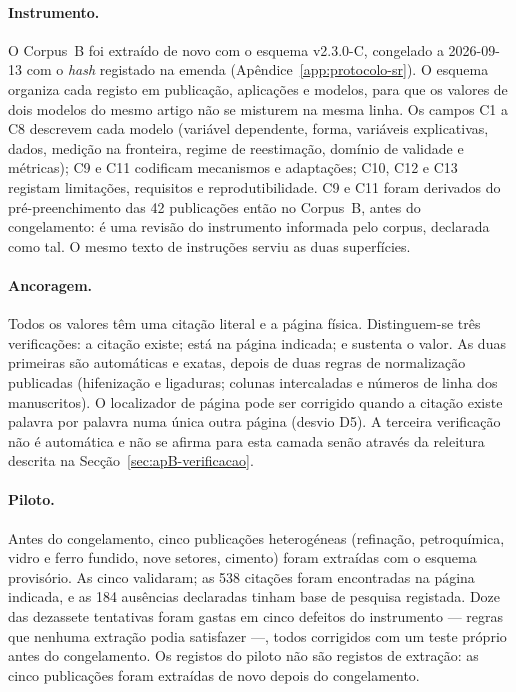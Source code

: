 \paragraph{Instrumento.} O Corpus~B foi extraído de novo com o esquema
v2.3.0-C, congelado a 2026-09-13 com o \emph{hash} registado na emenda
(Apêndice~\ref{app:protocolo-sr}). O esquema organiza cada registo em
publicação, aplicações e modelos, para que os valores de dois modelos do
mesmo artigo não se misturem na mesma linha. Os campos C1 a C8 descrevem cada
modelo (variável dependente, forma, variáveis explicativas, dados, medição na
fronteira, regime de reestimação, domínio de validade e métricas); C9 e C11
codificam mecanismos e adaptações; C10, C12 e C13 registam limitações,
requisitos e reprodutibilidade. C9 e C11 foram derivados do pré-preenchimento
das 42 publicações então no Corpus~B, antes do congelamento: é uma revisão do
instrumento informada pelo corpus, declarada como tal. O mesmo texto de
instruções serviu as duas superfícies.

\paragraph{Ancoragem.} Todos os valores têm uma citação literal e a página
física. Distinguem-se três verificações: a citação existe; está na página
indicada; e sustenta o valor. As duas primeiras são automáticas e exatas,
depois de duas regras de normalização publicadas (hifenização e ligaduras;
colunas intercaladas e números de linha dos manuscritos). O localizador de
página pode ser corrigido quando a citação existe palavra por palavra numa
única outra página (desvio D5). A terceira verificação não é automática e não
se afirma para esta camada senão através da releitura descrita na
Secção~\ref{sec:apB-verificacao}.

\paragraph{Piloto.} Antes do congelamento, cinco publicações heterogéneas
(refinação, petroquímica, vidro e ferro fundido, nove setores, cimento)
foram extraídas com o esquema provisório. As cinco validaram; as 538
citações foram encontradas na página indicada, e as 184 ausências declaradas
tinham base de pesquisa registada. Doze das dezassete tentativas foram gastas
em cinco defeitos do instrumento --- regras que nenhuma extração podia
satisfazer ---, todos corrigidos com um teste próprio antes do congelamento.
Os registos do piloto não são registos de extração: as cinco publicações
foram extraídas de novo depois do congelamento.

